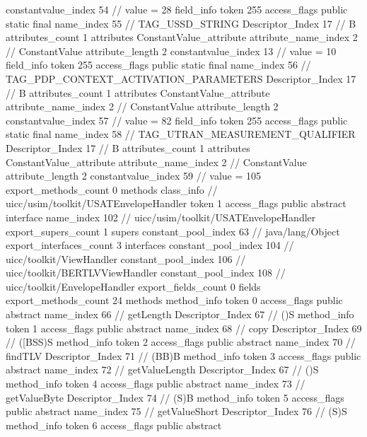 {{{{{{{					constantvalue_index	54		// value = 28
				}
				}
			}
			field_info {
				token	255
				access_flags	public static final
				name_index	55		// TAG_USSD_STRING
				Descriptor_Index	17		// B
				attributes_count	1
				attributes {
				ConstantValue_attribute {
					attribute_name_index	2		// ConstantValue
					attribute_length	2
					constantvalue_index	13		// value = 10
				}
				}
			}
			field_info {
				token	255
				access_flags	public static final
				name_index	56		// TAG_PDP_CONTEXT_ACTIVATION_PARAMETERS
				Descriptor_Index	17		// B
				attributes_count	1
				attributes {
				ConstantValue_attribute {
					attribute_name_index	2		// ConstantValue
					attribute_length	2
					constantvalue_index	57		// value = 82
				}
				}
			}
			field_info {
				token	255
				access_flags	public static final
				name_index	58		// TAG_UTRAN_MEASUREMENT_QUALIFIER
				Descriptor_Index	17		// B
				attributes_count	1
				attributes {
				ConstantValue_attribute {
					attribute_name_index	2		// ConstantValue
					attribute_length	2
					constantvalue_index	59		// value = 105
				}
				}
			}
			}
			export_methods_count	0
			methods {
			}
		}
		class_info {		// uicc/usim/toolkit/USATEnvelopeHandler
			token	1
			access_flags	public abstract interface
			name_index	102		// uicc/usim/toolkit/USATEnvelopeHandler
			export_supers_count	1
			supers {
				constant_pool_index	63		// java/lang/Object
			}
			export_interfaces_count	3
			interfaces {
				constant_pool_index	104		// uicc/toolkit/ViewHandler
				constant_pool_index	106		// uicc/toolkit/BERTLVViewHandler
				constant_pool_index	108		// uicc/toolkit/EnvelopeHandler
			}
			export_fields_count	0
			fields {
			}
			export_methods_count	24
			methods {
				method_info {
					token	0
					access_flags	public abstract
					name_index	66		// getLength
					Descriptor_Index	67		// ()S
				}
				method_info {
					token	1
					access_flags	public abstract
					name_index	68		// copy
					Descriptor_Index	69		// ([BSS)S
				}
				method_info {
					token	2
					access_flags	public abstract
					name_index	70		// findTLV
					Descriptor_Index	71		// (BB)B
				}
				method_info {
					token	3
					access_flags	public abstract
					name_index	72		// getValueLength
					Descriptor_Index	67		// ()S
				}
				method_info {
					token	4
					access_flags	public abstract
					name_index	73		// getValueByte
					Descriptor_Index	74		// (S)B
				}
				method_info {
					token	5
					access_flags	public abstract
					name_index	75		// getValueShort
					Descriptor_Index	76		// (S)S
				}
				method_info {
					token	6
					access_flags	public abstract
}}}}}
